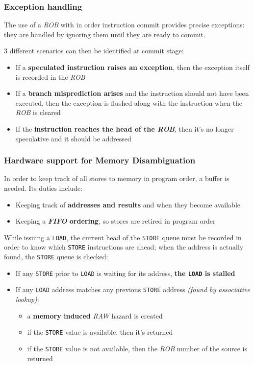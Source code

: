 \documentclass[english]{article}
\begin{document}
\subsubsection{Exception handling}

The use of a \textit{ROB} with in order instruction commit provides precise exceptions:
they are handled by ignoring them until they are ready to commit.

3 different scenarios can then be identified at commit stage:

\begin{itemize}
  \item If a \textbf{speculated instruction raises an exception}, then the exception itself is recorded in the \textit{ROB}
  \item If a \textbf{branch misprediction arises} and the instruction should not have been executed, then the exception is flushed along with the instruction when the \textit{ROB} is cleared
  \item If the \textbf{instruction reaches the head of the \textit{ROB}}, then it's no longer speculative and it should be addressed
\end{itemize}

\subsubsection{Hardware support for Memory Disambiguation}

In order to keep track of all stores to memory in program order, a buffer is needed.
Its duties include:

\begin{itemize}
  \item Keeping track of \textbf{addresses and results} and when they become available
  \item Keeping a \textbf{\textit{FIFO} ordering}, so stores are retired in program order
\end{itemize}

While issuing a \texttt{LOAD}, the current head of the \texttt{STORE} queue must be recorded in order to know which \texttt{STORE} instructions are ahead;
when the address is actually found, the \texttt{STORE} queue is checked:

\begin{itemize}
  \item If any \texttt{STORE} prior to \texttt{LOAD} is waiting for its address, \textbf{the \texttt{LOAD} is stalled}
  \item If any \texttt{LOAD} address matches any previous \texttt{STORE} address \textit{(found by associative lookup)}:
        \begin{itemize}[label=\(\rightarrow\)]
          \item a \textbf{memory induced} \textit{RAW} hazard is created
          \item if the \texttt{STORE} value is available, then it's returned
          \item if the \texttt{STORE} value is not available, then the \textit{ROB} number of the source is returned
        \end{itemize}
\end{itemize}
\end{document}

